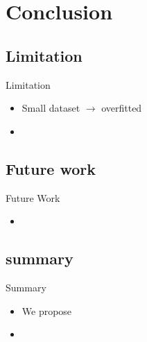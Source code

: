 \section{Conclusion}

\begin{frame}{}
  \subsection{Limitation}
  \begin{block}{Limitation}
    \begin{itemize}
        \item Small dataset $\rightarrow$ overfitted
        \item 
    \end{itemize}
  \end{block}
  \bigskip
  \subsection{Future work}
  \begin{block}{Future Work}
    \begin{itemize}
        \item 
    \end{itemize}
  \end{block}
\end{frame}

\subsection{summary}
\begin{frame}{Summary}
    \begin{itemize}
        \item We propose
        \item 
    \end{itemize}
\end{frame}